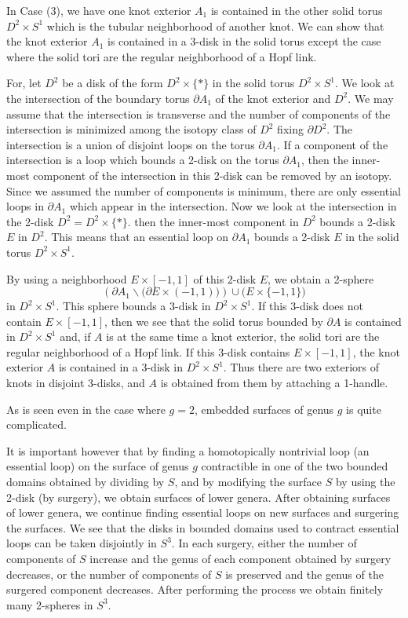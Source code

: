 \documentclass{amsart}
\numberwithin{equation}{section}
\newcommand{\bd}{\partial}
\newcommand{\ssm}{\smallsetminus}
\begin{document}
In Case (3), we have one knot exterior $A_1$ is contained in the other solid torus $D^2\times S^1$ which is the tubular neighborhood of another knot. We can show that 
the knot exterior $A_1$ is contained in a 3-disk in the solid torus except the case where the solid tori are the regular neighborhood of a Hopf link. 

For, let $D^2$ be a disk of the form $D^2\times \{*\}$ in the solid torus $D^2\times S^1$. We look at the intersection of the boundary torus $\bd A_1$ of the knot exterior and $D^2$. We may assume that the intersection is transverse and the number of components of the intersection is minimized among the isotopy class of $D^2$ fixing $\bd D^2$. The intersection is a union of disjoint loops on the torus $\bd A_1$. If a component of the intersection is a loop which bounds a 2-disk on the torus $\bd A_1$, then the inner-most component of the intersection in this 2-disk can be removed by an isotopy. Since we assumed the number of components is minimum, there are only essential loops in $\bd A_1$ which appear in the intersection. Now we look at the intersection in the 2-disk $D^2=D^2\times \{*\}$. then the inner-most component in $D^2$ bounds a 2-disk $E$ in $D^2$.  This means that an essential loop on $\bd A_1$ bounds a 2-disk $E$ in the solid torus $D^2\times S^1$. 

By using a neighborhood $E\times [-1,1]$ of this 2-disk $E$, we obtain a 2-sphere $$(\bd A_1 \ssm \big(\bd E\times (-1,1)\big))\cup \big(E\times \{-1,1\}\big)$$ in $D^2\times S^1$. This sphere bounds a 3-disk in $D^2\times S^1$. If this 3-disk does not contain  $E\times [-1,1]$, then we see that the solid torus bounded by $\bd A$ is contained in $D^2\times S^1$ and, if $A$ is at the same time a knot exterior, 
the solid tori are the regular neighborhood of a Hopf link. If this 3-disk contains $E\times [-1,1]$, the knot exterior $A$ is contained in a 3-disk in 
$D^2\times S^1$. Thus there are two exteriors of knots in disjoint 3-disks, and $A$ is obtained from them by attaching a 1-handle. 

As is seen even in the case where $g=2$, embedded surfaces of genus $g$ is quite complicated.

It is important however that by finding a homotopically nontrivial loop (an essential loop) on the surface of genus $g$ contractible in one of the two bounded domains obtained by dividing by $S$, and by modifying the surface $S$ by using the 2-disk (by surgery), we obtain surfaces of lower genera. After obtaining surfaces of lower genera,  we continue finding essential loops on new surfaces and surgering the surfaces. We see that the disks in bounded domains used to contract essential loops can be taken disjointly in $S^3$. In each surgery, either the number of components of $S$ increase and the genus of each component obtained by surgery decreases, or the number of components of $S$ is preserved and the genus of the surgered component decreases. 
After performing the process we obtain finitely many 2-spheres in $S^3$. 
\end{document}
